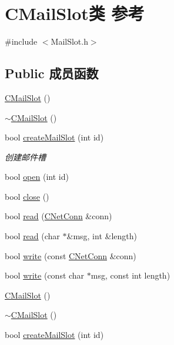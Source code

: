 \hypertarget{class_c_mail_slot}{}\section{C\+Mail\+Slot类 参考}
\label{class_c_mail_slot}


{\ttfamily \#include $<$Mail\+Slot.\+h$>$}

\subsection*{Public 成员函数}
\begin{DoxyCompactItemize}
\item 
\hyperlink{class_c_mail_slot_a78c844efb3e2d5e481fea0ef4e2bcbc5}{C\+Mail\+Slot} ()
\item 
\hyperlink{class_c_mail_slot_a53de8d448c7c6fd0df58b7ff019b1947}{$\sim$\+C\+Mail\+Slot} ()
\item 
bool \hyperlink{class_c_mail_slot_abdbc8ae85a1ae1f7c7998c43b1422535}{create\+Mail\+Slot} (int id)
\begin{DoxyCompactList}\small\item\em 创建邮件槽 \end{DoxyCompactList}\item 
bool \hyperlink{class_c_mail_slot_a23a09f6261450e62570ee1314c62eb97}{open} (int id)
\item 
bool \hyperlink{class_c_mail_slot_afc370072c2ab921ba66c55d1509262ad}{close} ()
\item 
bool \hyperlink{class_c_mail_slot_a8eb1b3b7bd937365ca865d76e25a4941}{read} (\hyperlink{class_c_net_conn}{C\+Net\+Conn} \&conn)
\item 
bool \hyperlink{class_c_mail_slot_a17b53bd1601b38ba99bac0dda7ac0794}{read} (char $\ast$\&msg, int \&length)
\item 
bool \hyperlink{class_c_mail_slot_a5eb6d0ece129a9c023cd058f45653427}{write} (const \hyperlink{class_c_net_conn}{C\+Net\+Conn} \&conn)
\item 
bool \hyperlink{class_c_mail_slot_add3c2a84d9d2e588f23e009c08c0ca2d}{write} (const char $\ast$msg, const int length)
\item 
\hyperlink{class_c_mail_slot_a78c844efb3e2d5e481fea0ef4e2bcbc5}{C\+Mail\+Slot} ()
\item 
\hyperlink{class_c_mail_slot_a53de8d448c7c6fd0df58b7ff019b1947}{$\sim$\+C\+Mail\+Slot} ()
\item 
bool \hyperlink{class_c_mail_slot_abdbc8ae85a1ae1f7c7998c43b1422535}{create\+Mail\+Slot} (int id)

\end{DoxyCompactItemize}
